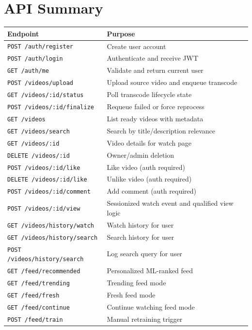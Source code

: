 \documentclass[11pt,a4paper]{article}
\begin{document}
\section{API Summary}
\begin{longtable}{@{}p{4.0cm}p{10.5cm}@{}}
\toprule
\textbf{Endpoint} & \textbf{Purpose} \\
\midrule
\endhead
\texttt{POST /auth/register} & Create user account \\
\texttt{POST /auth/login} & Authenticate and receive JWT \\
\texttt{GET /auth/me} & Validate and return current user \\
\texttt{POST /videos/upload} & Upload source video and enqueue transcode \\
\texttt{GET /videos/:id/status} & Poll transcode lifecycle state \\
\texttt{POST /videos/:id/finalize} & Requeue failed or force reprocess \\
\texttt{GET /videos} & List ready videos with metadata \\
\texttt{GET /videos/search} & Search by title/description relevance \\
\texttt{GET /videos/:id} & Video details for watch page \\
\texttt{DELETE /videos/:id} & Owner/admin deletion \\
\texttt{POST /videos/:id/like} & Like video (auth required) \\
\texttt{DELETE /videos/:id/like} & Unlike video (auth required) \\
\texttt{POST /videos/:id/comment} & Add comment (auth required) \\
\texttt{POST /videos/:id/view} & Sessionized watch event and qualified view logic \\
\texttt{GET /videos/history/watch} & Watch history for user \\
\texttt{GET /videos/history/search} & Search history for user \\
\texttt{POST /videos/history/search} & Log search query for user \\
\texttt{GET /feed/recommended} & Personalized ML-ranked feed \\
\texttt{GET /feed/trending} & Trending feed mode \\
\texttt{GET /feed/fresh} & Fresh feed mode \\
\texttt{GET /feed/continue} & Continue watching feed mode \\
\texttt{POST /feed/train} & Manual retraining trigger \\
\bottomrule
\end{longtable}
\end{document}
